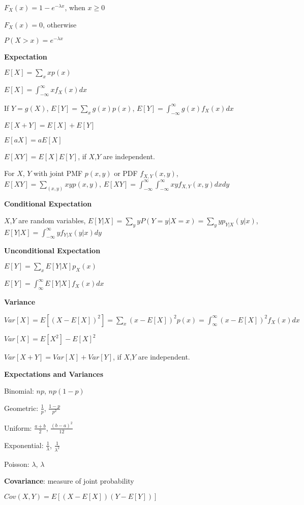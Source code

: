 \documentclass[10pt]{article}
\begin{document}
\begin{multicols*}{3}
$F_X(x)= 1-e^{-\lambda x}$, when $x\geq 0$

$F_X(x)=0$, otherwise

$P(X>x)=e^{-\lambda x}$



{\bf Expectation}

$E[X] = \sum_xxp(x)$

$E[X] = \int_{-\infty}^{\infty}xf_X(x)dx$

If $Y=g(X)$, $E[Y] = \sum_xg(x)p(x)$, $E[Y] = \int_{-\infty}^{\infty}g(x)f_X(x)dx$

$E[X+Y] = E[X] + E[Y]$

$E[aX] = aE[X]$

$E[XY] = E[X]E[Y]$, if $X$,$Y$ are independent.

For $X$, $Y$ with joint PMF $p(x,y)$ or PDF $f_{X,Y}(x,y)$, $E[XY] = \sum_{(x,y)}xyp(x,y)$, $E[XY] = \int_{-\infty}^{\infty}\int_{-\infty}^{\infty}xyf_{X,Y}(x,y)dxdy$



{\bf Conditional Expectation}

$X$,$Y$ are random variables, $E[Y|X] = \sum_yyP(Y=y|X=x)=\sum_yyp_{Y|X}(y|x)$, $E[Y|X] = \int_{-\infty}^{\infty}yf_{Y|X}(y|x)dy$



{\bf Unconditional Expectation}

$E[Y] = \sum_xE[Y|X]p_X(x)$

$E[Y] = \int_{\infty}^{\infty}E[Y|X]f_X(x)dx$



{\bf Variance}

$Var[X] = E[(X-E[X])^2] = \sum_x(x-E[X])^2p(x) = \int_{\infty}^{\infty}(x-E[X])^2f_X(x)dx$

$Var[X]=E[X^2]-E[X]^2$

$Var[X+Y]=Var[X]+Var[Y]$, if $X$,$Y$ are independent.



{\bf Expectations and Variances}

Binomial: $np$, $np(1-p)$

Geometric: $\frac{1}{p}$, $\frac{1-p}{p^2}$

Uniform: $\frac{a+b}{2}$, $\frac{(b-a)^2}{12}$

Exponential: $\frac{1}{\lambda}$, $\frac{1}{\lambda^2}$

Poisson: $\lambda$, $\lambda$



{\bf Covariance}: measure of joint probability

$Cov(X,Y) = E[(X-E[X])(Y-E[Y])]$


\end{multicols*}
\end{document}
